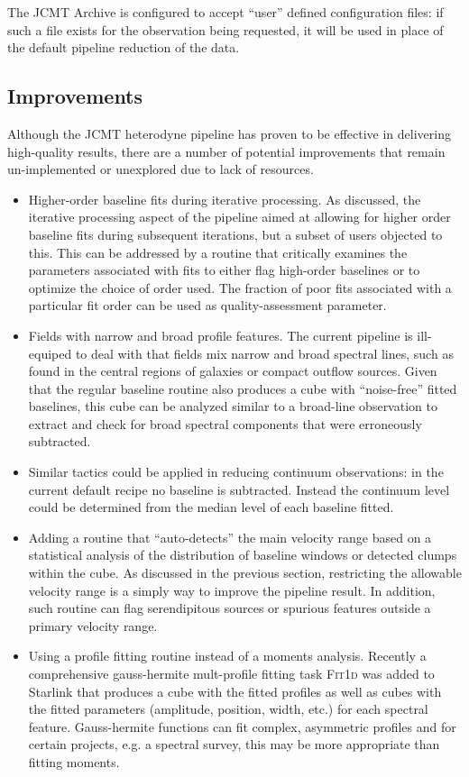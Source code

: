 \documentclass[final,authoryear,5p,times,twocolumn]{elsarticle}
\begin{document}
The JCMT Archive is configured to accept ``user'' defined configuration files: if such
a file exists for the observation being requested, it will be used in place of the default
pipeline reduction of the data.

\subsection{Improvements}

Although the JCMT heterodyne pipeline has proven to be effective in delivering
high-quality results, there are a number of potential improvements that remain 
un-implemented or unexplored due to lack of resources.

\begin{itemize}
\item  Higher-order baseline fits during iterative processing. As discussed, the
iterative processing aspect of the pipeline aimed at allowing for higher order
baseline fits during subsequent iterations, but a subset of users objected
to this. This can be addressed by a routine that critically examines the
parameters associated with fits to either flag high-order baselines
or to optimize the choice of order used. The fraction of poor fits associated
with a particular fit order can be used as quality-assessment parameter.
\item Fields with narrow and broad profile features.  The current pipeline
is ill-equiped to deal with that fields mix narrow and broad spectral
lines, such as found in the central regions of galaxies or compact
outflow sources. Given that the regular baseline routine also produces a 
cube with ``noise-free''  fitted baselines, this cube can be analyzed similar to a 
broad-line observation to extract and check for broad
spectral components that were erroneously subtracted.
\item Similar tactics could be applied in reducing continuum observations:
in the current default recipe  no baseline is subtracted. Instead the continuum
level could be determined from the median level of each baseline fitted. 
\item Adding a routine that ``auto-detects'' the main velocity range based
on a statistical analysis of the distribution of baseline windows or detected clumps
within the cube. As discussed in the previous section, restricting the allowable 
velocity range is a simply way to improve the pipeline result. In addition,
such routine can flag serendipitous sources or spurious features outside 
a primary velocity range.  
\item Using a profile fitting routine instead of a moments analysis. Recently a
comprehensive gauss-hermite mult-profile fitting task \textsc{Fit1d}  was 
added to Starlink that produces a cube with the fitted profiles as well
as cubes with the fitted parameters (amplitude, position, width, etc.) for 
each spectral feature. Gauss-hermite functions can fit complex, asymmetric
profiles and for certain projects, e.g. a spectral survey, this may be more
appropriate than fitting moments.
\end{itemize}
\end{document}
